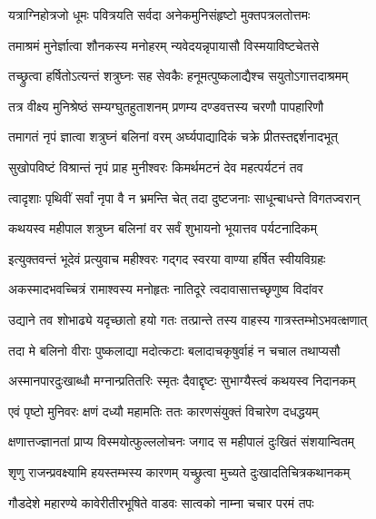 \twolineshloka
{यत्राग्निहोत्रजो धूमः पवित्रयति सर्वदा}
{अनेकमुनिसंहृष्टो मुक्तपत्रलतोत्तमः}%

\twolineshloka
{तमाश्रमं मुनेर्ज्ञात्वा शौनकस्य मनोहरम्}
{न्यवेदयन्नृपायासौ विस्मयाविष्टचेतसे}%

\twolineshloka
{तच्छ्रुत्वा हर्षितोऽत्यन्तं शत्रुघ्नः सह सेवकैः}
{हनूमत्पुष्कलाद्यैश्च सयुतोऽगात्तदाश्रमम्}%

\twolineshloka
{तत्र वीक्ष्य मुनिश्रेष्ठं सम्यग्घुतहुताशनम्}
{प्रणम्य दण्डवत्तस्य चरणौ पापहारिणौ}%

\twolineshloka
{तमागतं नृपं ज्ञात्वा शत्रुघ्नं बलिनां वरम्}
{अर्घ्यपाद्यादिकं चक्रे प्रीतस्तद्दर्शनादभूत्}%

\twolineshloka
{सुखोपविष्टं विश्रान्तं नृपं प्राह मुनीश्वरः}
{किमर्थमटनं देव महत्पर्यटनं तव}%

\twolineshloka
{त्वादृशाः पृथिवीं सर्वां नृपा वै न भ्रमन्ति चेत्}
{तदा दुष्टजनाः साधून्बाधन्ते विगतज्वरान्}%

\twolineshloka
{कथयस्व महीपाल शत्रुघ्न बलिनां वर}
{सर्वं शुभायनो भूयात्तव पर्यटनादिकम्}%


\twolineshloka
{इत्युक्तवन्तं भूदेवं प्रत्युवाच महीश्वरः}
{गद्गद स्वरया वाण्या हर्षित स्वीयविग्रहः}%


\twolineshloka
{अकस्मादभवच्चित्रं रामाश्वस्य मनोहृतः}
{नातिदूरे त्वदावासात्तच्छृणुष्व विदांवर}%

\twolineshloka
{उद्याने तव शोभाढ्ये यदृच्छातो हयो गतः}
{तत्प्रान्ते तस्य वाहस्य गात्रस्तम्भोऽभवत्क्षणात्}%

\twolineshloka
{तदा मे बलिनो वीराः पुष्कलाद्या मदोत्कटाः}
{बलादाचकृषुर्वाहं न चचाल तथाप्यसौ}%

\twolineshloka
{अस्मानपारदुःखाब्धौ मग्नान्प्रतितरिः स्मृतः}
{दैवाद्दृष्टः सुभाग्यैस्त्वं कथयस्व निदानकम्}%


\twolineshloka
{एवं पृष्टो मुनिवरः क्षणं दध्यौ महामतिः}
{ततः कारणसंयुक्तं विचारेण दधद्धयम्}%

\twolineshloka
{क्षणात्तज्ज्ञानतां प्राप्य विस्मयोत्फुल्ललोचनः}
{जगाद स महीपालं दुःखितं संशयान्वितम्}%


\twolineshloka
{शृणु राजन्प्रवक्ष्यामि हयस्तम्भस्य कारणम्}
{यच्छ्रुत्वा मुच्यते दुःखादतिचित्रकथानकम्}%

\twolineshloka
{गौडदेशे महारण्ये कावेरीतीरभूषिते}
{वाडवः सात्वको नाम्ना चचार परमं तपः}%

